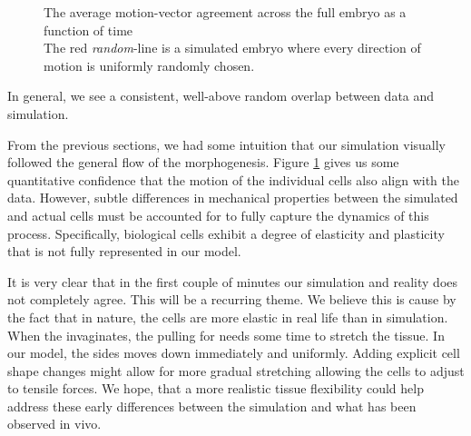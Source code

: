 \begin{figure}[H]
    \centering
    \caption{The average motion-vector agreement across the full embryo as a function of time\\
    The red \textit{random}-line is a simulated embryo where every direction of motion is uniformly randomly chosen. }
    \label{fig:motionAgreement}
\end{figure}


In general, we see a consistent, well-above random overlap between data and simulation. 

From the previous sections, we had some intuition that our simulation visually followed the general flow of the morphogenesis. Figure \ref{fig:motionAgreement} gives us some quantitative confidence that the motion of the individual cells also align with the data. However, subtle differences in mechanical properties between the simulated and actual cells must be accounted for to fully capture the dynamics of this process. Specifically, biological cells exhibit a degree of elasticity and plasticity that is not fully represented in our model.

It is very clear that in the first couple of minutes our simulation and reality does not completely agree. This will be a recurring theme. We believe this is cause by the fact that in nature, the cells are more elastic in real life than in simulation. When the  invaginates, the pulling for needs some time to stretch the tissue. In our model, the sides moves down immediately and uniformly. Adding explicit cell shape changes might allow for more gradual stretching allowing the cells to adjust to tensile forces. We hope, that a more realistic tissue flexibility could help address these early differences between the simulation and what has been observed in vivo.


